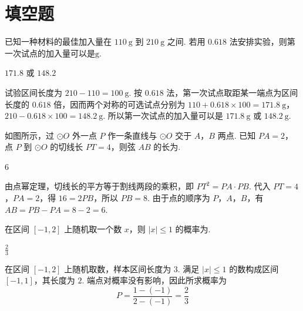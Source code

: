 \section{填空题}

\begin{problem}
已知一种材料的最佳加入量在 \(110 \mathrm{~g}\) 到 \(210 \mathrm{~g}\) 之间. 若用 \(0.618\) 法安排实验，则第一次试点的加入量可以是\fillinblank{}\(\mathrm{g}\).
\end{problem}

\begin{answer}
\(171.8\) 或 \(148.2\)
\end{answer}

\begin{solution}
试验区间长度为 \(210-110=100\mathrm{~g}\). 按 \(0.618\) 法，第一次试点取距某一端点为区间长度的 \(0.618\) 倍，因而两个对称的可选试点分别为
\(110+0.618\times100=171.8\mathrm{~g}\)，\(210-0.618\times100=148.2\mathrm{~g}\).
所以第一次试点的加入量可以是 \(171.8\mathrm{~g}\) 或 \(148.2\mathrm{~g}\).
\end{solution}

\begin{problem}
如图所示，过 \(\odot O\) 外一点 \(P\) 作一条直线与 \(\odot O\) 交于 \(A\)，\(B\) 两点. 已知 \(PA = 2\)，点 \(P\) 到 \(\odot O\) 的切线长 \(PT = 4\)，则弦 \(AB\) 的长为\fillinblank{}.

\end{problem}

\begin{answer}
6
\end{answer}

\begin{solution}
由点幂定理，切线长的平方等于割线两段的乘积，即
\(PT^2=PA\cdot PB\). 代入 \(PT=4\)，\(PA=2\)，得
\(16=2PB\)，所以 \(PB=8\). 由于点的顺序为 \(P\)，\(A\)，\(B\)，有
\(AB=PB-PA=8-2=6\).
\end{solution}

\begin{problem}
在区间 \([-1, 2]\) 上随机取一个数 \(x\)，则 \(|x| \leqslant 1\) 的概率为\fillinblank{}.
\end{problem}

\begin{answer}
\(\frac{2}{3}\)
\end{answer}

\begin{solution}
在区间 \([-1,2]\) 上随机取数，样本区间长度为 \(3\). 满足 \(|x|\leqslant1\) 的数构成区间 \([-1,1]\)，其长度为 \(2\). 端点对概率没有影响，因此所求概率为
\[
P=\frac{1-(-1)}{2-(-1)}=\frac23
\]
\end{solution}

